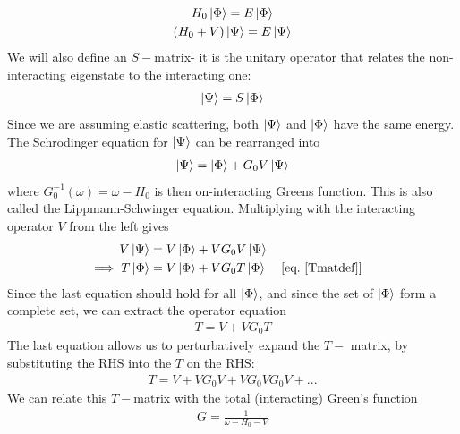 \documentclass[twoside]{report}
\numberwithin{equation}{section}
\begin{document}
\begin{gather}
	H_0 \ket{\Phi} = E \ket{\Phi}\\
(H_0 + V)\ket{\Psi} = E \ket{\Psi}
\end{gather}
We will also define an \(S-\)matrix- it is the unitary operator that relates the non-interacting eigenstate to the interacting one:
\begin{equation}\begin{aligned}
\label{Smatdef}
\ket{\Psi} = S\ket{\Phi}
\end{aligned}\end{equation}
Since we are assuming elastic scattering, both \(\ket{\Psi}\) and \(\ket{\Phi}\) have the same energy.
The Schrodinger equation for \(\ket{\Psi}\) can be rearranged into
\begin{equation}\begin{aligned}
	\label{lse}
\ket{\Psi} = \ket{\Phi} + G_0V\ket{\Psi}
\end{aligned}\end{equation}
where \(G_0^{-1}(\omega) = \omega - H_0\) is then on-interacting Greens function.
This is also called the Lippmann-Schwinger equation.
Multiplying with the interacting operator \(V\) from the left gives
\begin{equation}\begin{aligned}
	V\ket{\Psi} &= V\ket{\Phi} + VG_0V\ket{\Psi}\\
	\implies T\ket{\Phi} &= V\ket{\Phi} + VG_0 T\ket{\Phi} && \left[ \text{eq.~\ref{Tmatdef}} \right] 
\end{aligned}\end{equation}
Since the last equation should hold for all \(\ket{\Phi}\), and since the set of \(\ket{\Phi}\) form a complete set, we can extract the operator equation
\begin{equation}\begin{aligned}
	\label{TinG}
	T = V + V G_0 T
\end{aligned}\end{equation}
The last equation allows us to perturbatively expand the \(T-\) matrix, by substituting the RHS into the \(T\) on the RHS:
\begin{equation}\begin{aligned}
T = V + VG_0V + VG_0VG_0V + ...
\label{tmatexp}
\end{aligned}\end{equation}
We can relate this \(T-\)matrix with the total (interacting) Green's function
\begin{equation}\begin{aligned}
	G = \frac{1}{\omega - H_0 - V}
\end{aligned}\end{equation}
\end{document}
